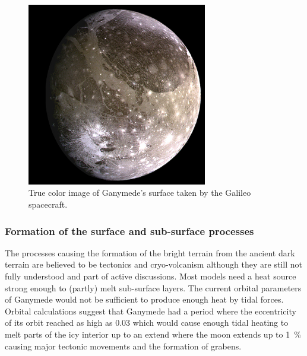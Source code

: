\begin{figure}
\begin{centering}
\includegraphics[width=0.7\textwidth]{Figures/Ganymede_true_color}
\par\end{centering}

\caption{True color image of Ganymede's surface taken by the Galileo spacecraft.\label{fig:Ganymed-true-color}}


\end{figure}



\subsubsection{Formation of the surface and sub-surface processes\label{sub:volcanism}}

The processes causing the formation of the bright terrain from the
ancient dark terrain are believed to be tectonics and cryo-volcanism
although they are still not fully understood and part of active discussions\cite{Patterson2010,Schenk2001,Showman2004}.
Most models need a heat source strong enough to (partly) melt sub-surface
layers. The current orbital parameters of Ganymede would not be sufficient
to produce enough heat by tidal forces. Orbital calculations suggest
that Ganymede had a period where the eccentricity of its orbit reached
as high as 0.03\cite{Showman1997} which would cause enough tidal
heating to melt parts of the icy interior up to an extend where the
moon extends up to 1~\% causing major tectonic movements and the
formation of grabens\cite{Showman2004}. 

